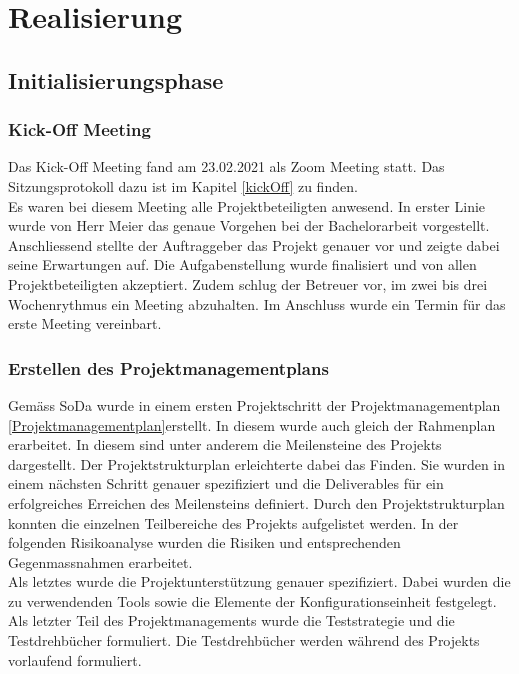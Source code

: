 \section{Realisierung}\label{realisierung}
\subsection{Initialisierungsphase}
\subsubsection{Kick-Off Meeting}
Das Kick-Off Meeting fand am 23.02.2021 als Zoom Meeting statt. Das Sitzungsprotokoll dazu ist im Kapitel \ref{kickOff} zu finden. \\
Es waren bei diesem Meeting alle Projektbeteiligten anwesend. In erster Linie wurde von Herr Meier das genaue Vorgehen bei der Bachelorarbeit vorgestellt. Anschliessend stellte der Auftraggeber das Projekt genauer vor und zeigte dabei seine Erwartungen auf. Die Aufgabenstellung wurde finalisiert und von allen Projektbeteiligten akzeptiert. Zudem schlug der Betreuer vor, im zwei bis drei Wochenrythmus ein Meeting abzuhalten. Im Anschluss wurde ein Termin für das erste Meeting vereinbart. 
\subsubsection{Erstellen des Projektmanagementplans}
Gemäss \ac{SoDa} wurde in einem ersten Projektschritt der Projektmanagementplan \ref{Projektmanagementplan}erstellt. In diesem wurde auch gleich der Rahmenplan erarbeitet. In diesem sind unter anderem die Meilensteine des Projekts dargestellt. Der Projektstrukturplan erleichterte dabei das Finden. Sie wurden in einem nächsten Schritt genauer spezifiziert und die Deliverables für ein erfolgreiches Erreichen des Meilensteins definiert. Durch den Projektstrukturplan konnten die einzelnen Teilbereiche des Projekts aufgelistet werden.
In der folgenden Risikoanalyse wurden die Risiken und entsprechenden Gegenmassnahmen erarbeitet. \\
Als letztes wurde die Projektunterstützung genauer spezifiziert. Dabei wurden die zu verwendenden Tools sowie die Elemente der Konfigurationseinheit festgelegt. \\
Als letzter Teil des Projektmanagements wurde die Teststrategie und die Testdrehbücher formuliert. Die Testdrehbücher werden während des Projekts vorlaufend formuliert. 

